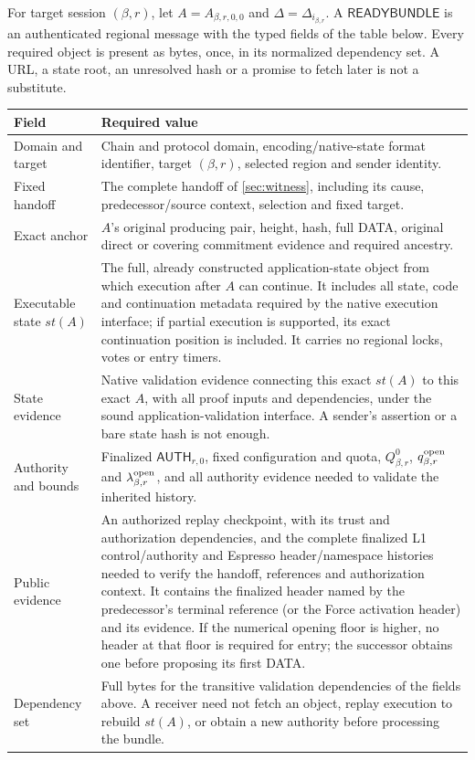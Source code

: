 \documentclass[11pt,a4paper]{article}
\newcommand{\tagg}[1]{\ensuremath{\mathsf{#1}}}
\newcounter{protocol}
\begin{document}
For target session $(\beta,r)$, let $A=A_{\beta,r,0,0}$ and
$\Delta=\Delta_{i_{\beta,r}}$. A \tagg{READYBUNDLE} is an authenticated
regional message with the typed fields of the table below. Every required
object is present as bytes, once, in its normalized dependency set. A
URL, a state root, an unresolved hash or a promise to fetch later is not
a substitute.
\begin{table}[htbp]\centering\small
\begin{tabularx}{\linewidth}{@{}>{\raggedright\arraybackslash}p{.25\linewidth}Y@{}}\toprule
Field & Required value\\\midrule
Domain and target & Chain and protocol domain, encoding/native-state
format identifier, target $(\beta,r)$, selected region and sender identity.\\
Fixed handoff & The complete handoff of \cref{sec:witness}, including
its cause, predecessor/source context, selection and fixed target.\\
Exact anchor & $A$'s original producing pair, height, hash, full DATA,
original direct or covering commitment evidence and required ancestry.\\
Executable state $\mathit{st}(A)$ & The full, already constructed application-state
object from which execution after $A$ can continue. It includes all state,
code and continuation metadata required by the native execution interface;
if partial execution is supported, its exact continuation position is
included. It carries no regional locks, votes or entry timers.\\
State evidence & Native validation evidence connecting this exact
$\mathit{st}(A)$ to this exact $A$, with all proof inputs and dependencies, under the
sound application-validation interface. A sender's assertion or a bare
state hash is not enough.\\
Authority and bounds & Finalized $\tagg{AUTH}_{r,0}$, fixed configuration
and quota, $Q^0_{\beta,r}$, $q^{\rm open}_{\beta,r}$ and
$\lambda^{\rm open}_{\beta,r}$, and all authority evidence needed to
validate the inherited history.\\
Public evidence & An authorized replay checkpoint, with its trust and
authorization dependencies, and the complete finalized L1
control/authority and Espresso header/namespace histories needed to
verify the handoff, references and authorization context. It contains the
finalized header named by the predecessor's terminal reference (or the
Force activation header) and its evidence. If the numerical opening floor
is higher, no header at that floor is required for entry; the successor
obtains one before proposing its first DATA.\\
Dependency set & Full bytes for the transitive validation dependencies
of the fields above. A receiver need not fetch an object, replay
execution to rebuild $\mathit{st}(A)$, or obtain a new authority before processing
the bundle.\\\bottomrule
\end{tabularx}
\end{table}
\end{document}
